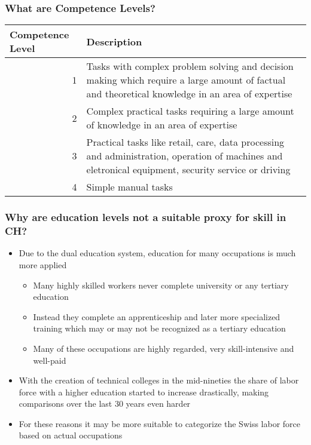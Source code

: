 \documentclass[11pt]{beamer} \usetheme{Frankfurt}
\begin{document}
\begin{frame}
  \frametitle{What are Competence Levels?}
  \begin{table}[htbp]
    \centering
    \begin{tabular}{rp{16.645em}}
      \toprule
      \multicolumn{1}{l}{Competence Level} & \multicolumn{1}{l}{Description} \\
      \midrule
      1     &  Tasks with complex problem solving and decision making which require a large amount of factual and theoretical knowledge in an area of expertise \\
      2     & Complex practical tasks requiring a large amount of knowledge in an area of expertise \\
      \midrule
      3     & Practical tasks like retail, care, data processing and administration, operation of machines and eletronical equipment, security service or driving \\
      4     & Simple manual tasks \\
      \bottomrule
    \end{tabular}%
    \label{tab:addlabel}%
  \end{table}%
\end{frame}

\begin{frame}
  \frametitle{Why are education levels not a suitable proxy for skill
    in CH?}
  \begin{itemize}
  \item Due to the dual education system, education for many
    occupations is much more applied
    \begin{itemize}
    \item Many highly skilled workers never complete university or any
      tertiary education
    \item Instead they complete an apprenticeship and later more
      specialized training which may or may not be recognized as a
      tertiary education
    \item Many of these occupations are highly regarded, very
      skill-intensive and well-paid
    \end{itemize}
  \item With the creation of technical colleges in the mid-nineties
    the share of labor force with a higher education started to
    increase drastically, making comparisons over the last 30 years
    even harder
  \item For these reasons it may be more suitable to categorize the
    Swiss labor force based on actual occupations
  \end{itemize}
\end{frame}
\end{document}
